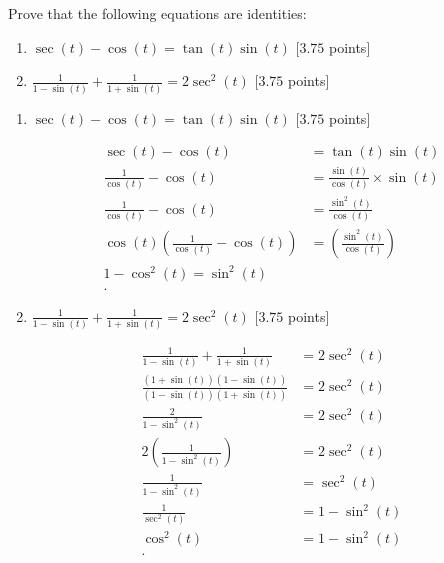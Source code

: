 \begin{problem}
  Prove that the following equations are identities:

  \begin{enumerate}
    \item $\sec (t) - \cos (t) = \tan (t)\sin (t)$ [$3.75$ points]
    \item $\frac{1}{1 - \sin (t)} + \frac{1}{1 + \sin (t)} = 2\sec^{2} (t)$ [$3.75$ points]
  \end{enumerate}
\end{problem}

\begin{solution}
  \begin{enumerate}
    \item $\sec (t) - \cos (t) = \tan (t)\sin (t)$ [$3.75$ points]

      \begin{align*}
        \sec (t) - \cos (t) &= \tan (t)\sin (t) \\
        \frac{1}{\cos (t)} - \cos (t) &= \frac{\sin (t)}{\cos (t)} \times \sin (t) \\
        \frac{1}{\cos (t)} - \cos (t) &= \frac{\sin^{2} (t)}{\cos (t)} \\
        \cos (t) \left(\frac{1}{\cos (t)} - \cos (t)\right) &= \left(\frac{\sin^{2} (t)}{\cos (t)} \right) \\
        1 - \cos^{2} (t) = \sin^{2} (t) \\
      .\end{align*}

    \item $\frac{1}{1 - \sin (t)} + \frac{1}{1 + \sin (t)} = 2\sec^{2} (t)$ [$3.75$ points]

    \begin{align*}
      \frac{1}{1- \sin (t)} + \frac{1}{1 + \sin (t)} &= 2\sec^{2} (t) \\
      \frac{(1 + \sin (t))(1 - \sin (t))}{(1 - \sin (t))(1 + \sin (t))} &= 2\sec^{2} (t) \\
      \frac{2}{1 - \sin^{2} (t)} &= 2\sec^{2} (t) \\
      2 \left(\frac{1}{1 - \sin^{2} (t)}\right) &= 2\sec^{2} (t) \\
      \frac{1}{1 - \sin^{2} (t)} &= \sec^{2} (t) \\
      \frac{1}{\sec^{2} (t)} &= 1 - \sin^{2} (t) \\
      \cos^{2} (t) &= 1 - \sin^{2} (t) \\
    .\end{align*}
  \end{enumerate}
\end{solution}

